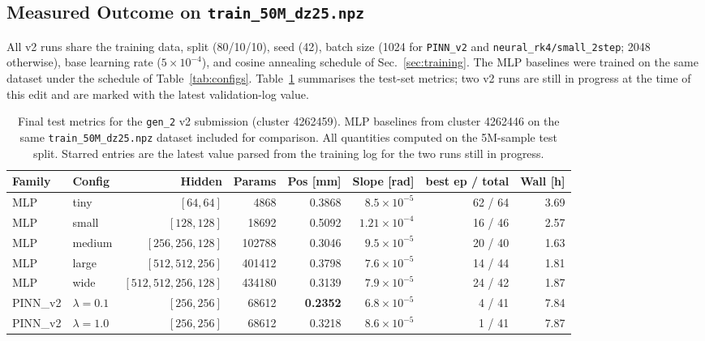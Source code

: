 \documentclass[a4paper,11pt]{article}
\newcommand{\num}[1]{#1}
\begin{document}
\subsection{Measured Outcome on \texttt{train\_50M\_dz25.npz}}
\label{sec:v2_results}

All v2 runs share the training data, split (80/10/10), seed (42), batch
size (1024 for \texttt{PINN\_v2} and \texttt{neural\_rk4/small\_2step};
2048 otherwise), base learning rate ($5 \times 10^{-4}$), and cosine
annealing schedule of Sec.~\ref{sec:training}.  The MLP baselines were
trained on the same dataset under the schedule of
Table~\ref{tab:configs}.  Table~\ref{tab:v2_results} summarises the
test-set metrics; two v2 runs are still in progress at the time of this
edit and are marked with the latest validation-log value.

\begin{table}[htbp]
\centering
\caption{Final test metrics for the \texttt{gen\_2} v2 submission
(cluster 4262459).  MLP baselines from cluster 4262446 on the same
\texttt{train\_50M\_dz25.npz} dataset included for comparison.  All
quantities computed on the 5M-sample test split.  Starred entries are
the latest value parsed from the training log for the two runs still in
progress.}
\label{tab:v2_results}
\footnotesize
\begin{tabular}{llrrrrrr}
Family & Config & Hidden & Params & Pos [mm] & Slope [rad] &
  best ep / total & Wall [h] \\
\hline
MLP       & tiny   & $[64, 64]$           & \num{4868}  & 0.3868 & $8.5 \times 10^{-5}$  & 62 / 64 & 3.69 \\
MLP       & small  & $[128, 128]$         & \num{18692} & 0.5092 & $1.21 \times 10^{-4}$ & 16 / 46 & 2.57 \\
MLP       & medium & $[256, 256, 128]$    & \num{102788}& 0.3046 & $9.5 \times 10^{-5}$  & 20 / 40 & 1.63 \\
MLP       & large  & $[512, 512, 256]$    & \num{401412}& 0.3798 & $7.6 \times 10^{-5}$  & 14 / 44 & 1.81 \\
MLP       & wide   & $[512, 512, 256, 128]$ & \num{434180}& 0.3139 & $7.9 \times 10^{-5}$  & 24 / 42 & 1.87 \\
\hline
PINN\_v2   & $\lambda = 0.1$  & $[256, 256]$ & \num{68612} & \textbf{0.2352} & $6.8 \times 10^{-5}$  & 4 / 41  & 7.84 \\
PINN\_v2   & $\lambda = 1.0$  & $[256, 256]$ & \num{68612} & 0.3218          & $8.6 \times 10^{-5}$  & 1 / 41  & 7.87 \\

\end{tabular}
\end{table}
\end{document}
